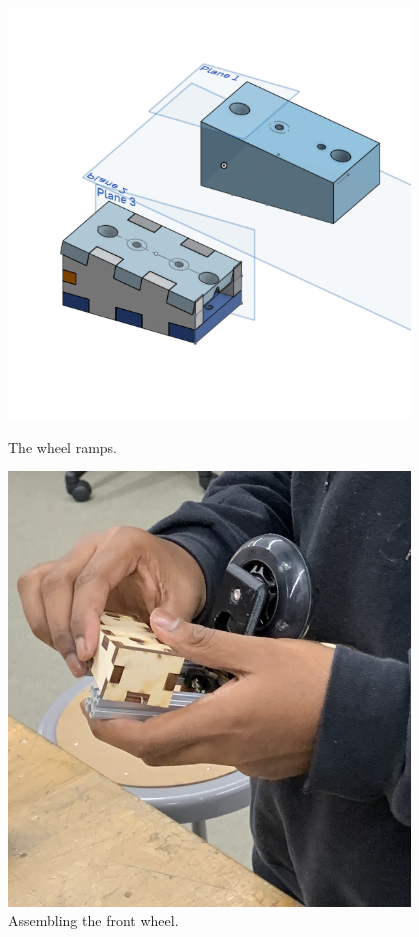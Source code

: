  

\begin{figure}[ht]
\centering
\begin{minipage}[b]{.48\textwidth}
  \centering
  \includegraphics[width=0.95\textwidth]{Meetings/October/10-11-21/10-11-21_Hardware_Figure1 - Nathan Forrer.PNG}
  \caption{The wheel ramps.}
  \label{fig:101121_1}
\end{minipage}%
\hfill%
\begin{minipage}[b]{.48\textwidth}
  \centering
  \includegraphics[width=0.95\textwidth]{Meetings/October/10-11-21/10-11-21_Hardware_Figure2 - Nathan Forrer.jpg}
  \caption{Assembling the front wheel.}
  \label{fig:101121_2}
\end{minipage}
\end{figure}

